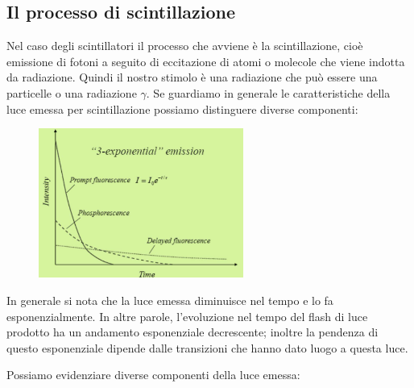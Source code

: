 \subsection{Il processo di scintillazione}
Nel caso degli scintillatori il processo che avviene è la scintillazione, cioè emissione di fotoni a seguito di eccitazione di atomi o molecole che viene indotta da radiazione. Quindi il nostro stimolo è una radiazione che può essere una particelle o una radiazione $\gamma$. Se guardiamo in generale le caratteristiche della luce emessa per scintillazione possiamo distinguere diverse componenti:
\begin{figure}[H]
   \centering
   \includegraphics[width=0.6\textwidth]{immagini/tipi_di_luce.png}
\end{figure}
In generale si nota che la luce emessa diminuisce nel tempo e lo fa esponenzialmente. In altre parole, l'evoluzione nel tempo del flash di luce prodotto ha un andamento esponenziale decrescente; inoltre la pendenza di questo esponenziale dipende dalle transizioni che hanno dato luogo a questa luce.

Possiamo evidenziare diverse componenti della luce emessa:

